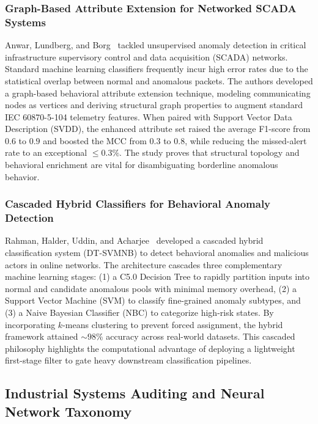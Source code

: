 \documentclass[12pt,a4paper]{report}
\begin{document}
\subsubsection{Graph-Based Attribute Extension for Networked SCADA Systems}
Anwar, Lundberg, and Borg~\cite{ref_anwar2022_scada} tackled unsupervised anomaly detection in critical infrastructure supervisory control and data acquisition (SCADA) networks. Standard machine learning classifiers frequently incur high error rates due to the statistical overlap between normal and anomalous packets. The authors developed a graph-based behavioral attribute extension technique, modeling communicating nodes as vertices and deriving structural graph properties to augment standard IEC 60870-5-104 telemetry features. When paired with Support Vector Data Description (SVDD), the enhanced attribute set raised the average F1-score from $0.6$ to $0.9$ and boosted the MCC from $0.3$ to $0.8$, while reducing the missed-alert rate to an exceptional $\le 0.3\%$. The study proves that structural topology and behavioral enrichment are vital for disambiguating borderline anomalous behavior.

\subsubsection{Cascaded Hybrid Classifiers for Behavioral Anomaly Detection}
Rahman, Halder, Uddin, and Acharjee~\cite{ref_rahman2021_social} developed a cascaded hybrid classification system (DT-SVMNB) to detect behavioral anomalies and malicious actors in online networks. The architecture cascades three complementary machine learning stages: (1) a C5.0 Decision Tree to rapidly partition inputs into normal and candidate anomalous pools with minimal memory overhead, (2) a Support Vector Machine (SVM) to classify fine-grained anomaly subtypes, and (3) a Naive Bayesian Classifier (NBC) to categorize high-risk states. By incorporating $k$-means clustering to prevent forced assignment, the hybrid framework attained $\sim 98\%$ accuracy across real-world datasets. This cascaded philosophy highlights the computational advantage of deploying a lightweight first-stage filter to gate heavy downstream classification pipelines.

\subsection{Industrial Systems Auditing and Neural Network Taxonomy}
\end{document}
